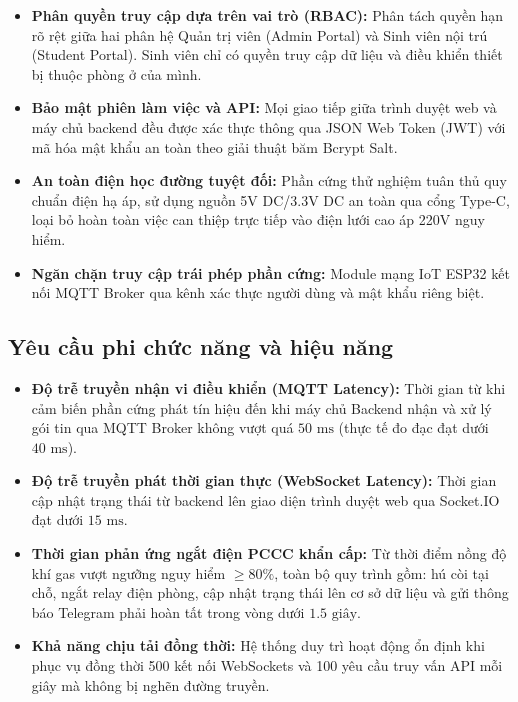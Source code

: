 \begin{itemize}
    \item \textbf{Phân quyền truy cập dựa trên vai trò (RBAC):} Phân tách quyền hạn rõ rệt giữa hai phân hệ Quản trị viên (Admin Portal) và Sinh viên nội trú (Student Portal). Sinh viên chỉ có quyền truy cập dữ liệu và điều khiển thiết bị thuộc phòng ở của mình.
    \item \textbf{Bảo mật phiên làm việc và API:} Mọi giao tiếp giữa trình duyệt web và máy chủ backend đều được xác thực thông qua JSON Web Token (JWT) với mã hóa mật khẩu an toàn theo giải thuật băm Bcrypt Salt.
    \item \textbf{An toàn điện học đường tuyệt đối:} Phần cứng thử nghiệm tuân thủ quy chuẩn điện hạ áp, sử dụng nguồn 5V DC/3.3V DC an toàn qua cổng Type-C, loại bỏ hoàn toàn việc can thiệp trực tiếp vào điện lưới cao áp 220V nguy hiểm.
    \item \textbf{Ngăn chặn truy cập trái phép phần cứng:} Module mạng IoT ESP32 kết nối MQTT Broker qua kênh xác thực người dùng và mật khẩu riêng biệt.
\end{itemize}

\subsection{Yêu cầu phi chức năng và hiệu năng}
\label{subsec:yeu_cau_hieu_nang}

\begin{itemize}
    \item \textbf{Độ trễ truyền nhận vi điều khiển (MQTT Latency):} Thời gian từ khi cảm biến phần cứng phát tín hiệu đến khi máy chủ Backend nhận và xử lý gói tin qua MQTT Broker không vượt quá $50\text{ ms}$ (thực tế đo đạc đạt dưới $40\text{ ms}$).
    \item \textbf{Độ trễ truyền phát thời gian thực (WebSocket Latency):} Thời gian cập nhật trạng thái từ backend lên giao diện trình duyệt web qua Socket.IO đạt dưới $15\text{ ms}$.
    \item \textbf{Thời gian phản ứng ngắt điện PCCC khẩn cấp:} Từ thời điểm nồng độ khí gas vượt ngưỡng nguy hiểm $\ge 80\%$, toàn bộ quy trình gồm: hú còi tại chỗ, ngắt relay điện phòng, cập nhật trạng thái lên cơ sở dữ liệu và gửi thông báo Telegram phải hoàn tất trong vòng dưới $1.5\text{ giây}$.
    \item \textbf{Khả năng chịu tải đồng thời:} Hệ thống duy trì hoạt động ổn định khi phục vụ đồng thời 500 kết nối WebSockets và 100 yêu cầu truy vấn API mỗi giây mà không bị nghẽn đường truyền.
\end{itemize}

